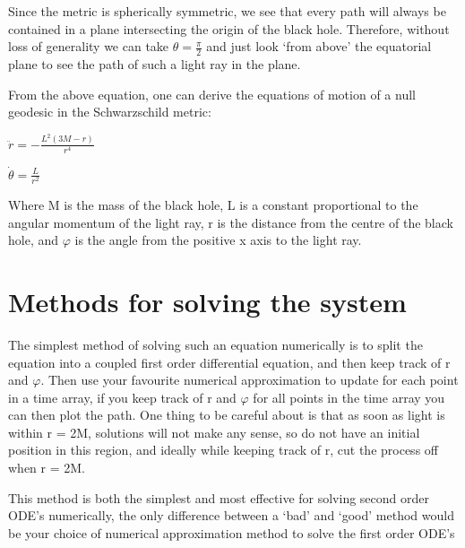 \documentclass[oneside,openright,frontopenright]{dmathesis}
\begin{document}
	Since the metric is spherically symmetric, we see that every path will always be contained in a plane intersecting the origin of the black hole. Therefore, without loss of generality we can take ${\theta}=\frac{\pi}{2}$ and just look ‘from above’ the equatorial plane to see the path of such a light ray in the plane.

	From the above equation, one can derive the equations of motion of a null geodesic in the Schwarzschild metric:


	$\ddot{r}=-\frac{L^2(3M-r)}{r^4}$

	$\dot{\theta}=\frac{L}{r^2}$


	Where M is the mass of the black hole, L is a constant proportional to the angular momentum of the light ray, r is the distance from the centre of the black hole, and $\varphi$ is the angle from the positive x axis to the light ray.

\section{Methods for solving the system}
	The simplest method of solving such an equation numerically is to split the equation into a coupled first order differential equation, and then keep track of r and $\varphi$. Then use your favourite numerical approximation to update for each point in a time array, if you keep track of r and $\varphi$ for all points in the time array you can then plot the path. One thing to be careful about is that as soon as light is within r = 2M, solutions will not make any sense, so do not have an initial position in this region, and ideally while keeping track of r, cut the process off when r = 2M.

	This method is both the simplest and most effective for solving second order ODE’s numerically, the only difference between a ‘bad’ and ‘good’ method would be your choice of numerical approximation method to solve the first order ODE’s
\end{document}
